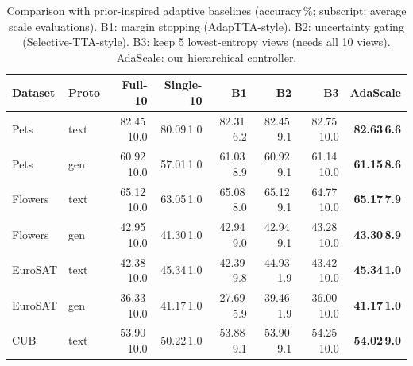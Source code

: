 \begin{table}[t]
\centering
\caption{Comparison with prior-inspired adaptive baselines (accuracy\,\%; subscript: average scale evaluations). B1: margin stopping (AdapTTA-style). B2: uncertainty gating (Selective-TTA-style). B3: keep 5 lowest-entropy views (needs all 10 views). AdaScale: our hierarchical controller.}
\label{tab:baselines}
\scriptsize
\setlength{\tabcolsep}{2.5pt}
\begin{tabular}{llrrrrrr}
\hline
Dataset & Proto & Full-10 & Single-10 & B1 & B2 & B3 & AdaScale \\
\hline
Pets & text & 82.45\,{\tiny 10.0} & 80.09\,{\tiny 1.0} & 82.31\,{\tiny 6.2} & 82.45\,{\tiny 9.1} & 82.75\,{\tiny 10.0} & \textbf{82.63\,{\tiny 6.6}} \\
Pets & gen & 60.92\,{\tiny 10.0} & 57.01\,{\tiny 1.0} & 61.03\,{\tiny 8.9} & 60.92\,{\tiny 9.1} & 61.14\,{\tiny 10.0} & \textbf{61.15\,{\tiny 8.6}} \\
Flowers & text & 65.12\,{\tiny 10.0} & 63.05\,{\tiny 1.0} & 65.08\,{\tiny 8.0} & 65.12\,{\tiny 9.1} & 64.77\,{\tiny 10.0} & \textbf{65.17\,{\tiny 7.9}} \\
Flowers & gen & 42.95\,{\tiny 10.0} & 41.30\,{\tiny 1.0} & 42.94\,{\tiny 9.0} & 42.94\,{\tiny 9.1} & 43.28\,{\tiny 10.0} & \textbf{43.30\,{\tiny 8.9}} \\
EuroSAT & text & 42.38\,{\tiny 10.0} & 45.34\,{\tiny 1.0} & 42.39\,{\tiny 9.8} & 44.93\,{\tiny 1.9} & 43.42\,{\tiny 10.0} & \textbf{45.34\,{\tiny 1.0}} \\
EuroSAT & gen & 36.33\,{\tiny 10.0} & 41.17\,{\tiny 1.0} & 27.69\,{\tiny 5.9} & 39.46\,{\tiny 1.9} & 36.00\,{\tiny 10.0} & \textbf{41.17\,{\tiny 1.0}} \\
CUB & text & 53.90\,{\tiny 10.0} & 50.22\,{\tiny 1.0} & 53.88\,{\tiny 9.1} & 53.90\,{\tiny 9.1} & 54.25\,{\tiny 10.0} & \textbf{54.02\,{\tiny 9.0}} \\
\hline
\end{tabular}
\end{table}
